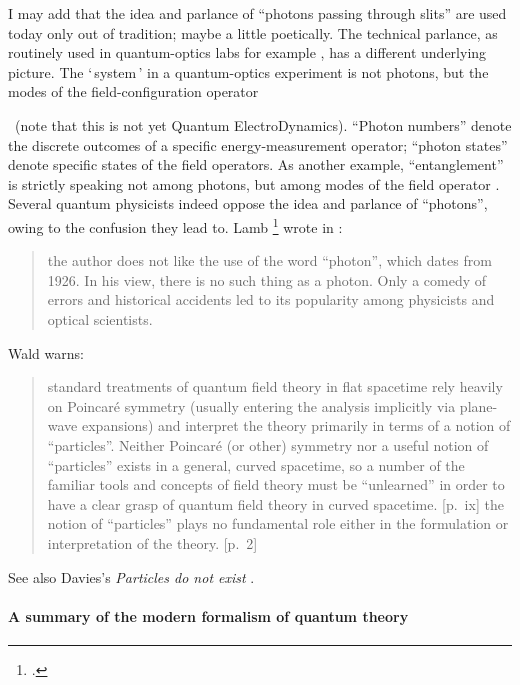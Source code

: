 \documentclass[\ifafour a4paper,12pt,\else a5paper,10pt,\fi%
onecolumn,oneside,article,%
british%
]{memoir}
\newcommand*{\defquote}[1]{`\,#1\,'}
\theoremstyle{remark}
\theoremstyle{innote}
\newcommand*{\citep}{\parencites}%
\newcommand*{\citey}{\parencites*}
\newcommand*{\ibid}{\unspace\addtocounter{footnote}{-1}\footnotemark{}}
\renewcommand*{\|}[1][]{\nonscript\,#1\vert\nonscript\;\mathopen{}}
\begin{document}
I may add that the idea and parlance of \enquote{photons passing through
  slits} are used today only out of tradition; maybe a little poetically.
The technical parlance, as routinely used in quantum-optics labs for
example \citep{leonhardt1997,bachoretal1998_r2004}, has a different
underlying picture. The \defquote{system} in a quantum-optics experiment is
not photons, but the modes of the field-configuration operator\ibid\ (note
that this is not yet Quantum ElectroDynamics). \enquote{Photon numbers}
denote the discrete outcomes of a specific energy-measurement operator;
\enquote{photon states} denote specific states of the field operators. As
another example, \enquote{entanglement} is strictly speaking not among
photons, but among modes of the field operator \citep{vanenk2003b}. Several
quantum physicists indeed oppose the idea and parlance of
\enquote{photons}, owing to the confusion they lead to. Lamb \footcite[of the
Lamb shift,][]{lambetal1947} wrote in \cite*{lamb1995}:
\begin{quote}
  \footnotesize the author does not like the use of the word ``photon'',
  which dates from 1926. In his view, there is no such thing as a photon.
  Only a comedy of errors and historical accidents led to its popularity
  among physicists and optical scientists.
\end{quote}
Wald \citey{wald1994} warns:
\begin{quote}
  \footnotesize standard treatments of quantum field theory in flat
  spacetime rely heavily on Poincar\'e symmetry (usually entering the
  analysis implicitly via plane-wave expansions) and interpret the theory
  primarily in terms of a notion of ``particles''. Neither Poincar\'e (or
  other) symmetry nor a useful notion of ``particles'' exists in a general,
  curved spacetime, so a number of the familiar tools and concepts of field
  theory must be ``unlearned'' in order to have a clear grasp of quantum
  field theory in curved spacetime. [p.~ix] \textelp{} the notion of
  ``particles'' plays no fundamental role either in the formulation or
  interpretation of the theory. [p.~2]
\end{quote}
See also Davies's \emph{Particles do not exist} \citey{davies1984}.

\bigskip

\paragraph{A summary of the modern formalism of quantum theory}
\end{document}
